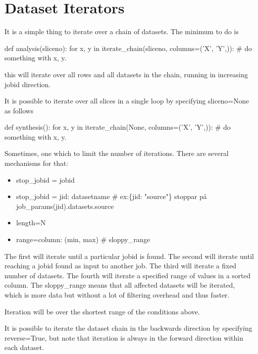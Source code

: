 \section{Dataset Iterators}

It is a simple thing to iterate over a chain of datasets.  The minimum
to do is 

\begin{python}
  def analysis(sliceno):
    for x, y in iterate_chain(sliceno, columns=('X', 'Y',)):
      # do something with x, y.
\end{python}
this will iterate over all rows and all datasets in the chain, running
in increasing jobid direction.

It is possible to iterate over all slices in a single loop by
specifying sliceno=None as follows

\begin{python}
  def synthesis():
    for x, y in iterate_chain(None, columns=('X', 'Y',)):
      # do something with x, y.
\end{python}

Sometimes, one which to limit the number of iterations.  There are
several mechanisms for that:
\begin{itemize}
\item stop\_jobid = jobid
\item stop\_jobid = {jid: datasetname}
  \# ex:\{jid: "source"\} stoppar på job\_params(jid).datasets.source
\item length=N
\item range={column: (min, max)}  \# sloppy\_range
\end{itemize}

The first will iterate until a particular jobid is found.  The second
will iterate until reaching a jobid found as input to another job.
The third will iterate a fixed number of datasets.  The fourth will
iterate a specified range of values in a sorted column.  The
sloppy\_range means that all affected datasets will be iterated, which
is more data but without a lot of filtering overhead and thus faster.

Iteration will be over the shortest range of the conditions above.

It is possible to iterate the dataset chain in the backwards direction
by specifying reverse=True, but note that iteration is always in the
forward direction within each dataset.





